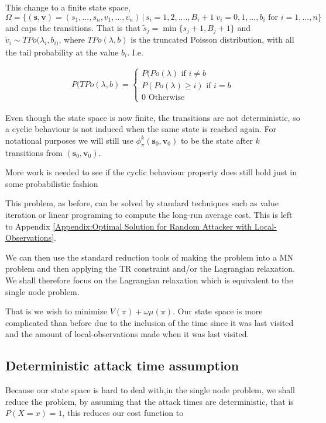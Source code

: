 \documentclass[a4paper,10pt]{article}
\theoremstyle{definition}
\theoremstyle{definition}
\theoremstyle{remark}
\theoremstyle{definition}
\begin{document}
This change to a finite state space, $\Omega = \{ (\bm{s},\bm{v})=(s_{1},...,s_{n},v_{1},...,v_{n}) \, | \, s_{i}=1,2,....,B_{i}+1 \; v_{i}=0,1,...,b_{i}  \text{ for } i=1,...,n\}$ and caps the transitions. That is that $\widetilde{s}_{j}= \min \{s_{j}+1, B_{j}+1 \}$ and $\widetilde{v}_{i} \sim TPo(\lambda_{i},b_{i)}$, where $TPo(\lambda,b)$ is the truncated Poisson distribution, with all the tail probability at the value $b_{i}$. I.e.

\begin{align*}
P(TPo(\lambda,b)=\begin{cases}
P(Po(\lambda) \text{ if } i \neq b \\
P(Po(\lambda) \geq i) \text{ if } i=b \\
0 \text{ Otherwise}
\end{cases}
\end{align*}

Even though the state space is now finite, the transitions are not deterministic, so a cyclic behaviour is not induced when the same state is reached again. For notational purposes we will still use $\phi^{k}_{\pi}(\bm{s}_{0},\bm{v}_{0})$ to be the state after $k$ transitions from $(\bm{s}_{0},\bm{v}_{0})$.

\begin{Huge}
More work is needed to see if the cyclic behaviour property does still hold just in some probabilistic fashion
\end{Huge}

This problem, as before, can be solved by standard techniques such as value iteration or linear programing to compute the long-run average cost. This is left to Appendix \ref{Appendix:Optimal Solution for Random Attacker with Local-Observations}.

We can then use the standard reduction tools of making the problem into a MN problem and then applying the TR constraint and/or the Lagrangian relaxation. We shall therefore focus on the Lagrangian relaxation which is equivalent to the single node problem.

That is we wish to minimize $V(\pi)+\omega \mu(\pi)$. Our state space is more complicated than before due to the inclusion of the time since it was last visited and the amount of local-observations made when it was last visited.

\subsection{Deterministic attack time assumption}
\label{Section:Deterministic attack time assumption}
Because our state space is hard to deal with,in the single node problem, we shall reduce the problem, by assuming that the attack times are deterministic, that is $P(X=x)=1$, this reduces our cost function to
\end{document}
